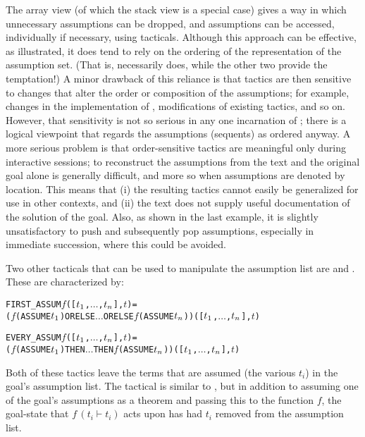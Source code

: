 The array view (of which the stack view is a special case)
gives a way in which unnecessary assumptions can
be dropped, and assumptions can be accessed, individually if necessary,
using tacticals.
Although this approach can be effective, as illustrated, it does
tend to rely on the ordering of the representation of the assumption
 set.
(That is,  necessarily does, while the other two provide the
temptation!) A minor drawback of this reliance is that tactics are then
sensitive to changes that alter the order or composition of the assumptions;
for example, changes in the implementation of \HOL, modifications of
existing tactics, and so on.
However, that sensitivity is not so serious in any one incarnation of \HOL;
there is a logical viewpoint that regards the assumptions (sequents) as
ordered anyway.
A more serious problem is that order-sensitive tactics are meaningful
only during interactive sessions; to reconstruct the assumptions from
the \ML{} text and the original goal alone is generally difficult,
and more so when assumptions are denoted by location.
This means that (i) the resulting tactics cannot easily be generalized
for use in other contexts, and (ii) the \ML{} text does not supply
useful documentation
 of the solution of the goal.
Also, as shown in the last example, it is slightly unsatisfactory
to push and subsequently pop assumptions, especially in immediate succession,
where this could be avoided.

Two other tacticals that can be used to manipulate the assumption list are
 and .
These are characterized by:

\begin{hol}
\begin{alltt}
   FIRST_ASSUM \(f\) ([\(t\sb{1}\), \(\ldots\) ,\(t\sb{n}\)], \(t\)) =
    (\(f\)(ASSUME \(t\sb{1}\)) ORELSE \(\ldots\) ORELSE \(f\)(ASSUME \(t\sb{n}\))) ([\(t\sb{1}\), \(\ldots\) ,\(t\sb{n}\)], \(t\))

   EVERY_ASSUM \(f\) ([\(t\sb{1}\), \(\ldots\) ,\(t\sb{n}\)], \(t\)) =
    (\(f\)(ASSUME \(t\sb{1}\)) THEN \(\ldots\) THEN  \(f\)(ASSUME \(t\sb{n}\))) ([\(t\sb{1}\), \(\ldots\) ,\(t\sb{n}\)], \(t\))
\end{alltt}
\end{hol}

Both of these tactics leave the terms that are assumed (the various $t_i$) in the goal's assumption list.
The  tactical is similar to , but in addition to assuming one of the goal's assumptions as a theorem and passing this to the function $f$, the goal-state that $f\,(t_i\vdash t_i)$ acts upon has had $t_i$ removed from the assumption list.


